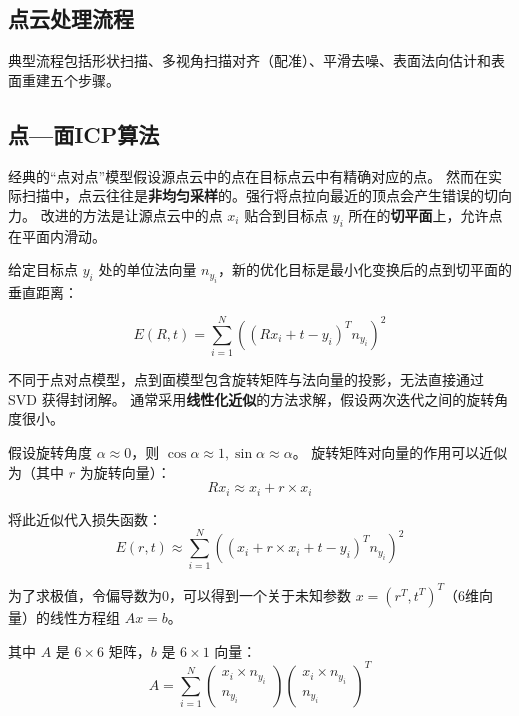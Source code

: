 \documentclass[12pt]{article}
\begin{document}
\subsection{点云处理流程}

典型流程包括形状扫描、多视角扫描对齐（配准）、平滑去噪、表面法向估计和表面重建五个步骤。

\subsection{点—面ICP算法}

经典的“点对点”模型假设源点云中的点在目标点云中有精确对应的点。
然而在实际扫描中，点云往往是\textbf{非均匀采样}的。强行将点拉向最近的顶点会产生错误的切向力。
改进的方法是让源点云中的点 $x_i$ 贴合到目标点 $y_i$ 所在的\textbf{切平面}上，允许点在平面内滑动。

给定目标点 $y_i$ 处的单位法向量 $n_{y_i}$，新的优化目标是最小化变换后的点到切平面的垂直距离：

\begin{equation}
    E(R, t) = \sum_{i=1}^{N} \left( (R x_i + t - y_i)^T n_{y_i} \right)^2
\end{equation}

不同于点对点模型，点到面模型包含旋转矩阵与法向量的投影，无法直接通过 SVD 获得封闭解。
通常采用\textbf{线性化近似}的方法求解，假设两次迭代之间的旋转角度很小。

假设旋转角度 $\alpha \approx 0$，则 $\cos \alpha \approx 1, \sin \alpha \approx \alpha$。
旋转矩阵对向量的作用可以近似为（其中 $r$ 为旋转向量）：
\begin{equation}
    R x_i \approx x_i + r \times x_i
\end{equation}

将此近似代入损失函数：
\begin{equation}
    E(r, t) \approx \sum_{i=1}^{N} \left( (x_i + r \times x_i + t - y_i)^T n_{y_i} \right)^2
\end{equation}

为了求极值，令偏导数为0，可以得到一个关于未知参数 $x = (r^T, t^T)^T$（6维向量）的线性方程组 $Ax = b$。

其中 $A$ 是 $6 \times 6$ 矩阵，$b$ 是 $6 \times 1$ 向量：
\begin{equation}
    A = \sum_{i=1}^{N} 
    \begin{pmatrix} 
    x_i \times n_{y_i} \\ 
    n_{y_i} 
    \end{pmatrix} 
    \begin{pmatrix} 
    x_i \times n_{y_i} \\ 
    n_{y_i} 
    \end{pmatrix}^T
\end{equation}
\end{document}
